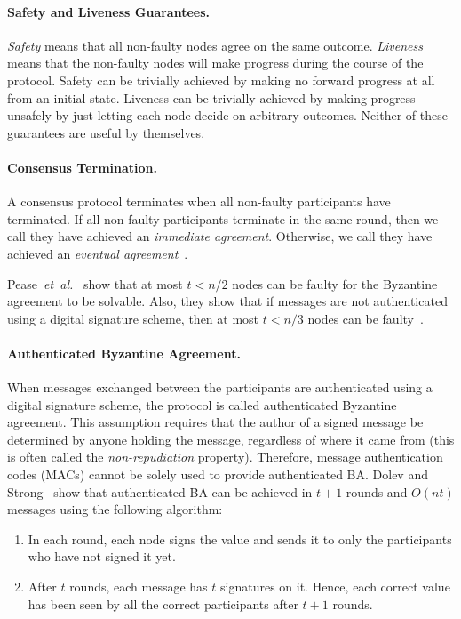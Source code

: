 \documentclass[11pt]{article}
\newcommand{\etal}{\textit{et~al.}}
\theoremstyle{mytheoremstyle}
\begin{document}
\paragraph{Safety and Liveness Guarantees.} \emph{Safety} means that all non-faulty nodes agree on the same outcome. \emph{Liveness} means that the non-faulty nodes will make progress during the course of the protocol. Safety can be trivially achieved by making no forward progress at all from an initial state. Liveness can be trivially achieved by making progress unsafely by just letting each node decide on arbitrary outcomes. Neither of these guarantees are useful by themselves.

\paragraph{Consensus Termination.} A consensus protocol terminates when all non-faulty participants have terminated. If all non-faulty participants terminate in the same round, then we call they have achieved an \emph{immediate agreement}. Otherwise, we call they have achieved an \emph{eventual agreement}~\cite{fischer}.

Pease~\etal~\cite{pease80reaching} show that at most ${t<n/2}$ nodes can be faulty for the Byzantine agreement to be solvable. Also, they show that if messages are not authenticated using a digital signature scheme, then at most ${t<n/3}$ nodes can be faulty~\cite{pease80reaching}.

\paragraph{Authenticated Byzantine Agreement.}
When messages exchanged between the participants are authenticated using a digital signature scheme, the protocol is called authenticated Byzantine agreement. This assumption requires that the author of a signed message be determined by anyone holding the message, regardless of where it came from (this is often called the \emph{non-repudiation} property). Therefore, message authentication codes (MACs) cannot be solely used to provide authenticated BA. Dolev and Strong~\cite{Dolev:Strong:83} show that authenticated BA can be achieved in $t+1$ rounds and $O(nt)$ messages using the following algorithm:

\begin{enumerate}
	\item In each round, each node signs the value and sends it to only the participants who have not signed it yet.
	\item After $t$ rounds, each message has $t$ signatures on it. Hence, each correct value has been seen by all the correct participants after $t+1$ rounds.
\end{enumerate}
\end{document}
